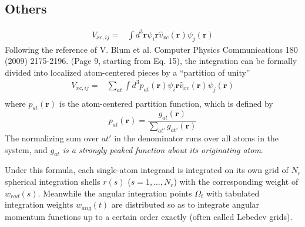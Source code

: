 \documentclass[a4paper,12pt]{article}
\begin{document}
\subsection{Others}
\begin{equation}
	\begin{split}
		V_{xc,ij} = &\int d^3\textbf{r}\psi_i\textbf{r}\hat{v}_{xc}(\textbf{r})\psi_j(\textbf{r})
	\end{split}
\end{equation}
Following the reference of V. Blum et al. Computer Physics Communications 180 (2009) 2175-2196. (Page 9, starting from Eq. 15),
the integration can be formally divided into localized atom-centered pieces by a ``partition of unity''
\begin{equation}
	\begin{split}
		V_{xc,ij} = &\sum_{at}\int d^3p_{at}(\textbf{r})\psi_i\textbf{r}\hat{v}_{xc}(\textbf{r})\psi_j(\textbf{r})\\
	\end{split}
\end{equation}
where $p_{at}(\textbf{r})$ is the atom-centered partition function, which is defined by
\begin{equation}
	p_{at}(\textbf{r})=\frac{g_{at}(\textbf{r})}{\sum_{at'}g_{at'}(\textbf{r})}
\end{equation}
The normalizing sum over $at'$ in the denominator runs over all atoms in the system, and 
\textit{$g_{at}$ is a strongly peaked function about its originating atom}.

Under this formula, each single-atom integrand is integrated on its own grid of $N_r$ spherical integration shells 
$r(s)$ ($s=1,\dots, N_r$) with the corresponding weight of $w_{rad}(s)$.
Meanwhile the angular integration points $\Omega_t$ with tabulated integration weights $w_{ang}(t)$ are distributed so as to integrate angular
momentum functions up to a certain order exactly (often called Lebedev grids).


\end{document}
